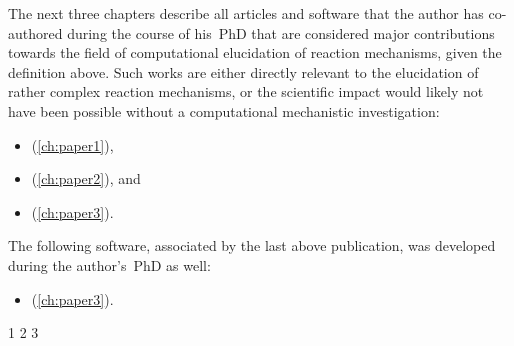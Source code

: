 The next three chapters describe all articles and software that the author has co-authored
during the course of his~PhD that are considered major contributions towards the field of
computational elucidation of reaction mechanisms, given the definition above.
Such works are either directly relevant to the elucidation of rather complex reaction
mechanisms, or the scientific impact would likely not have been possible without a
computational mechanistic investigation:
%
\begin{itemize}
	\item {} (\cref{ch:paper1}),
	\item {} (\cref{ch:paper2}), and
	\item {} (\cref{ch:paper3}).
\end{itemize}
%
The following software, associated by the last above publication, was developed during the
author's~PhD as well:
%
\begin{itemize}
	\item {} (\cref{ch:paper3}).
\end{itemize}

{1}
{2}
{3}
